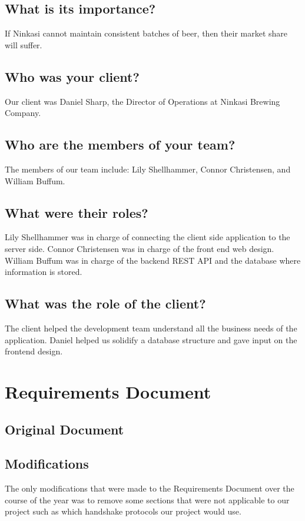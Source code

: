 \documentclass[draftclsnofoot,onecolumn,letterpaper,10pt]{IEEEtran}
\begin{document}
	\subsection{What is its importance?}
	If Ninkasi cannot maintain consistent batches of beer, then their market share will suffer.

	\subsection{Who was your client?}
	Our client was Daniel Sharp, the Director of Operations at Ninkasi Brewing Company.

	\subsection{Who are the members of your team?}
	The members of our team include: Lily Shellhammer, Connor Christensen, and William Buffum.

	\subsection{What were their roles?}
	Lily Shellhammer was in charge of connecting the client side application to the server side.
	Connor Christensen was in charge of the front end web design.
	William Buffum was in charge of the backend REST API and the database where information is stored.

	\subsection{What was the role of the client?}
	The client helped the development team understand all the business needs of the application.
	Daniel helped us solidify a database structure and gave input on the frontend design.
	
\section{Requirements Document}
	\subsection{Original Document}
	
	\subsection{Modifications}
	The only modifications that were made to the Requirements Document over the course of the year was to remove some sections that were not applicable to our project such as which handshake protocols our project would use.
\end{document}
